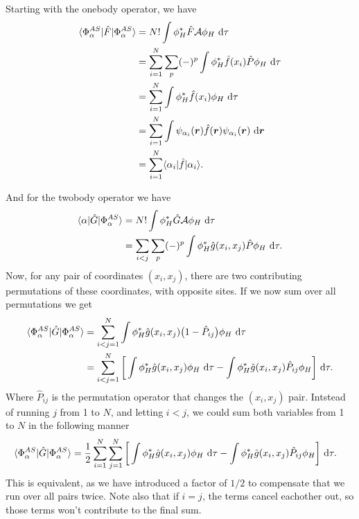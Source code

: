 \documentclass[a4paper, 11pt, notitlepage, english]{article}
\newcommand{\op}[1]{\hat{#1}}
\newcommand{\braopket}[3]{\langle #1 | {#2} | #3 \rangle}
\renewcommand{\d}{{\rm d}}
\newcommand{\bt}[1]{\boldsymbol{#1}}
\begin{document}
Starting with the onebody operator, we have
\begin{align*}
\braopket{\Phi^{AS}_{\alpha}}{\op{F}}{\Phi^{AS}_{\alpha}} &= N!\int \phi_H^* \op{F} \mathcal{A} \phi_H \ \d \tau \\
&= \sum_{i=1}^N \sum_p (-)^p \int \phi_H^* \op{f}(x_i) \op{P} \phi_H \ \d \tau \\
&= \sum_{i=1}^N \int \phi_H^* \op{f}(x_i) \phi_H \ \d \tau \\
&= \sum_{i=1}^N \int \psi_{\alpha_i}(\bt{r}) \op{f}(\bt{r}) \psi_{\alpha_i}(\bt{r}) \ \d \bt{r} \\
&= \sum_{i=1}^N \braopket{\alpha_i}{\op{f}}{\alpha_i}.
\end{align*}

And for the twobody operator we have
\begin{align*}
\braopket{\alpha}{\op{G}}{\Phi^{AS}_{\alpha}} &= N!\int \phi_H^* \op{G} \mathcal{A} \phi_H \ \d \tau \\
&= \sum_{i<j} \sum_p (-)^p \int \phi_H^* \op{g}(x_i,x_j) \op{P} \phi_H \ \d \tau.
\end{align*}
Now, for any pair of coordinates $(x_i, x_j)$, there are two contributing permutations of these coordinates, with opposite sites. If we now sum over all permutations we get
\begin{align*}
\braopket{\Phi^{AS}_{\alpha}}{\op{G}}{\Phi^{AS}_{\alpha}} 
&= \sum_{i<j=1}^N \int \phi_H^* \op{g}(x_i,x_j) \big(1 - \op{P}_{ij}\big) \phi_H \ \d \tau \\
&= \sum_{i<j=1}^N \bigg[\int \phi_H^* \op{g}(x_i,x_j) \phi_H \ \d \tau - \int \phi_H^* \op{g}(x_i,x_j) \op{P}_{ij} \phi_H \bigg] \ \d \tau.
\end{align*}
Where $\op{P}_{ij}$ is the permutation operator that changes the $(x_i, x_j)$ pair. Intstead of running $j$ from 1 to $N$, and letting $i<j$, we could sum both variables from 1 to $N$ in the following manner
\begin{align*}
\braopket{\Phi^{AS}_{\alpha}}{\op{G}}{\Phi^{AS}_{\alpha}} 
&= \frac{1}{2}\sum_{i=1}^N\sum_{j=1}^N \bigg[\int \phi_H^* \op{g}(x_i,x_j) \phi_H \ \d \tau - \int \phi_H^* \op{g}(x_i,x_j) \op{P}_{ij} \phi_H \bigg] \ \d \tau.
\end{align*}
This is equivalent, as we have introduced a factor of $1/2$ to compensate that we run over all pairs twice. Note also that if $i=j$, the terms cancel eachother out, so those terms won't contribute to the final sum.
\end{document}
